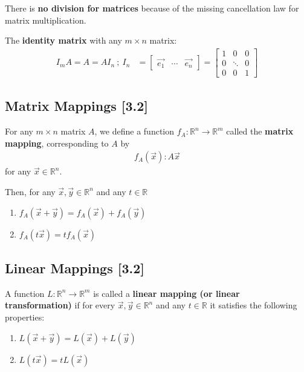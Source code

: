 \documentclass[a4paper,9pt]{extarticle}
\begin{document}
\begin{multicols*}{2}
There is \textbf{no division for matrices} because of the missing cancellation law for matrix multiplication.

The \textbf{identity matrix} with any $m \times n$ matrix:
\begin{equation} \label{3.1-6}
    \begin{split}
        I_m A = A = A I_n \ ; \ I_n & = \begin{bmatrix} \vec{e_1} & \cdots & \vec{e_n}\end{bmatrix} = \begin{bmatrix}1 & 0 & 0 \\ 0 & \ddots & 0 \\ 0 & 0 & 1 \end{bmatrix}
    \end{split}
\end{equation}


\subsection{Matrix Mappings [3.2]}
For any $m \times n$  matrix $A$, we define a function $f_A: \mathbb{R}^n \to \mathbb{R}^m$ called the \textbf{matrix mapping}, corresponding to $A$ by
\begin{equation} \label{3.2-1}
    \begin{split}
        f_A(\vec{x}): A \vec{x}
    \end{split}
\end{equation}
for any $\vec{x} \in \mathbb{R}^n$.

Then, for any $\vec{x}, \vec{y} \in \mathbb{R}^n$ and any $t \in \mathbb{R}$
\begin{enumerate}[label=\bfseries (L\arabic*)] \itemsep0pt \parskip0pt 
    \item $f_A(\vec{x} + \vec{y}) = f_A(\vec{x}) + f_A(\vec{y})$
    \item $f_A(t \vec{x}) = t f_A(\vec{x})$
\end{enumerate}


\subsection{Linear Mappings [3.2]}
A function $L: \mathbb{R}^n \to \mathbb{R}^m$ is called a \textbf{linear mapping (or linear transformation)} if for every $\vec{x}, \vec{y} \in \mathbb{R}^n$ and any $t \in \mathbb{R}$ it satisfies the following properties:
\begin{enumerate}[label=\bfseries (L\arabic*)] \itemsep0pt \parskip0pt 
    \item $L(\vec{x} + \vec{y}) = L(\vec{x}) + L(\vec{y})$
    \item $L(t \vec{x}) = t L(\vec{x})$
\end{enumerate}


\end{multicols*}
\end{document}
